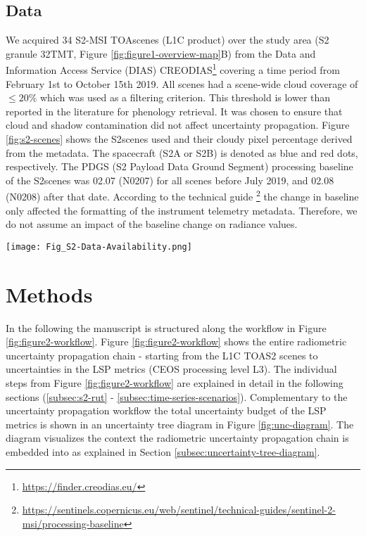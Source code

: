     
\subsection{Data}
We acquired 34 \gls{S2}-{MSI} \gls{TOA}scenes (L1C product) over the study area (\gls{S2} granule 32TMT, Figure \ref{fig:figure1-overview-map}B) from the Data and Information Access Service (DIAS) CREODIAS\footnote{\url{https://finder.creodias.eu/}} covering a time period from February 1st to October 15th 2019. All scenes had a scene-wide cloud coverage of $\le20\%$ which was used as a filtering criterion. This threshold is lower than reported in the literature for phenology retrieval. It was chosen to ensure that cloud and shadow contamination did not affect uncertainty propagation.
Figure \ref{fig:s2-scenes} shows the \gls{S2}scenes used and their cloudy pixel percentage derived from the metadata. The spacecraft (S2A or S2B) is denoted as blue and red dots, respectively. The PDGS (\gls{S2} Payload Data Ground Segment) processing baseline of the \gls{S2}scenes was 02.07 (N0207) for all scenes before July  2019, and 02.08 (N0208) after that date. According to the technical guide \footnote{\url{https://sentinels.copernicus.eu/web/sentinel/technical-guides/sentinel-2-msi/processing-baseline}} the change in baseline only affected the formatting of the instrument telemetry metadata. Therefore, we do not assume an impact of the baseline change on radiance values.

\begin{figure*}
    \centering
    \texttt{[image: Fig\_S2-Data-Availability.png]}
    \caption{S2 scenes used plotted against their scene-wide cloudy pixel percentage. Red dots denotes observations made by S2B, blue dots represent S2A scenes. The two different PDGS processing baselines are separated by the grey dashed line.}
    \label{fig:s2-scenes}
\end{figure*}


\section{Methods}
\label{sec:unc_methods}

In the following the manuscript is structured along the workflow in Figure \ref{fig:figure2-workflow}. Figure \ref{fig:figure2-workflow} shows the entire radiometric uncertainty propagation chain - starting from the L1C \gls{TOA}S2 scenes to uncertainties in the \gls{LSP} metrics (CEOS processing level L3). The individual steps from Figure \ref{fig:figure2-workflow} are explained in detail in the following sections (\ref{subsec:s2-rut} - \ref{subsec:time-series-scenarios}). Complementary to the uncertainty propagation workflow the total uncertainty budget of the \gls{LSP} metrics is shown in an uncertainty tree diagram in Figure \ref{fig:unc-diagram}. The diagram visualizes the context the radiometric uncertainty propagation chain is embedded into as explained in Section \ref{subsec:uncertainty-tree-diagram}.


